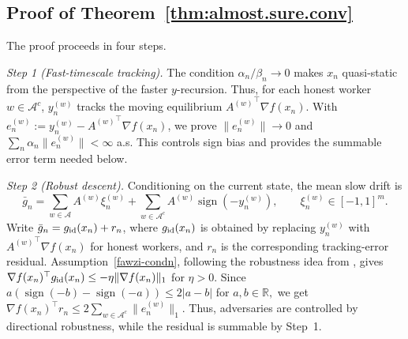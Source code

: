 \documentclass{article}
\DeclareMathOperator*{\sign}{sign}
\newcommand{\bR}{\mathbb{R}}
\newcommand{\cA}{\mathcal{A}}
\begin{document}






\subsection{Proof of Theorem~\ref{thm:almost.sure.conv}}
The proof proceeds in four steps.

\emph{Step 1 (Fast-timescale tracking).}
The condition $\alpha_n/\beta_n\to0$ makes $x_n$ quasi-static from the
perspective of the faster $y$-recursion. Thus, for each honest worker
$w\in\cA^c$, $y_n^{(w)}$ tracks the moving equilibrium
${A^{(w)}}^\top\nabla f(x_n)$. With
$e_n^{(w)}:=y_n^{(w)}-{A^{(w)}}^\top\nabla f(x_n)$, we prove
$\|e_n^{(w)}\|\to0$ and
$\sum_n\alpha_n\|e_n^{(w)}\|<\infty$ a.s. This controls sign bias and provides
the summable error term needed below.

\emph{Step 2 (Robust  descent).}
Conditioning on the current state, the mean slow drift is
\[
\bar g_n
=
\sum_{w\in\cA}A^{(w)}\xi_n^{(w)}
+
\sum_{w\in\cA^c}A^{(w)}\sign(-y_n^{(w)}),
\qquad
\xi_n^{(w)}\in[-1,1]^m .
\]
Write $\bar g_n=g_{\rm id}(x_n)+r_n$, where $g_{\rm id}(x_n)$ is obtained by
replacing $y_n^{(w)}$ with ${A^{(w)}}^\top\nabla f(x_n)$ for honest workers,
and $r_n$ is the corresponding tracking-error residual. Assumption~\ref{fawzi-condn},
following the robustness idea from \citep{ganesh2023online}, gives
$\nabla f(x_n)^\top g_{\rm id}(x_n)\le-\eta\|\nabla f(x_n)\|_1$ for $\eta > 0$.
Since $a(\sign(-b)-\sign(-a))\le2|a-b|$ for $a, b \in \bR,$ we get
$\nabla f(x_n)^\top r_n
\le2\sum_{w\in\cA^c}\|e_n^{(w)}\|_1$.
Thus, adversaries are controlled by directional robustness, while the residual
is summable by Step~1.
\end{document}
